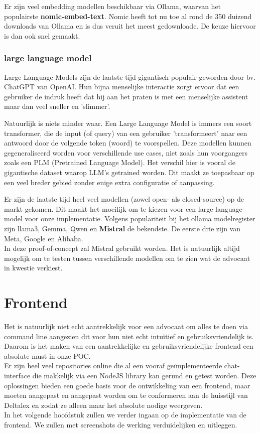 Er zijn veel embedding modellen beschikbaar via Ollama, waarvan het populairste \textbf{nomic-embed-text}. 
Nomic heeft tot nu toe al rond de 350 duizend downloads van Ollama en is dus veruit het meest gedownloade. 
De keuze hiervoor is dan ook snel gemaakt. 

\subsubsection{large language model}
Large Language Models zijn de laatste tijd gigantisch populair geworden door bv. ChatGPT van OpenAI.
Hun bijna menselijke interactie zorgt ervoor dat een gebruiker de indruk heeft dat hij aan het praten is met een menselijke assistent maar dan veel sneller en 'slimmer'.

Natuurlijk is niets minder waar.
Een Large Language Model is immers een soort transformer, die de input (of query) van een gebruiker 'transformeert' naar een antwoord door de volgende token (woord) te voorspellen.
Deze modellen kunnen gegeneraliseerd worden voor verschillende use cases, niet zoals hun voorgangers zoals een PLM (Pretrained Language Model).
Het verschil hier is vooral de gigantische dataset waarop LLM's getrained worden.
Dit maakt ze toepasbaar op een veel breder gebied zonder enige extra configuratie of aanpassing.

Er zijn de laatste tijd heel veel modellen (zowel open- als closed-source) op de markt gekomen. Dit maakt het moeilijk om te kiezen voor een large-language-model voor onze implementatie. 
Volgens populariteit bij het ollama modelregister zijn llama3, Gemma, Qwen en \textbf{Mistral} de bekendste. De eerste drie zijn van Meta, Google en Alibaba. \\

In deze proof-of-concept zal Mistral gebruikt worden. Het is natuurlijk altijd mogelijk om te testen tussen verschillende modellen om te zien wat de advocaat in kwestie verkiest. 

\section{Frontend}
Het is natuurlijk niet echt aantrekkelijk voor een advocaat om alles te doen via command line aangezien dit voor hun niet echt intuïtief en gebruiksvriendelijk is. 
Daarom is het maken van een aantrekkelijke en gebruiksvriendelijke frontend een absolute must in onze POC. \\ 

Er zijn heel veel repositories online die al een vooraf geïmplementeerde chat-interface die makkelijk via een NodeJS library kan gerund en getest worden. 
Deze oplossingen bieden een goede basis voor de ontwikkeling van een frontend, maar moeten aangepast en aangepast worden om te conformeren aan de huisstijl van Deltalex en zodat ze alleen maar het absolute nodige weergeven. \\

In het volgende hoofdstuk zullen we verder ingaan op de implementatie van de frontend. 
We zullen met screenshots de werking verduidelijken en uitleggen. 

